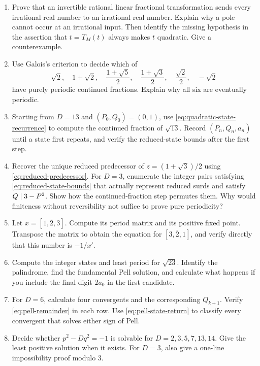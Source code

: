 \begin{exercisebox}
\begin{enumerate}
  \item Prove that an invertible rational linear fractional transformation
  sends every irrational real number to an irrational real number.
  Explain why a pole cannot occur at an irrational input. Then identify
  the missing hypothesis in the assertion that $t=T_M(t)$ always makes
  $t$ quadratic. Give a counterexample. 
  \item Use Galois's criterion to decide which of
  \[
   \sqrt2,\quad 1+\sqrt2,\quad \frac{1+\sqrt5}{2},\quad
   \frac{1+\sqrt3}{2},\quad \frac{\sqrt2}{2},\quad -\sqrt2
  \]
  have purely periodic continued fractions. Explain why all six are
  eventually periodic. 
  \item Starting from $D=13$ and $(P_0,Q_0)=(0,1)$, use
  \eqref{eq:quadratic-state-recurrence} to compute the continued fraction
  of $\sqrt{13}$. Record $(P_n,Q_n,a_n)$ until a state first repeats,
  and verify the reduced-state bounds after the first step.
  \item Recover the unique reduced predecessor of
  $z=(1+\sqrt3)/2$ using \eqref{eq:reduced-predecessor}.
  For $D=3$, enumerate the integer pairs satisfying
  \eqref{eq:reduced-state-bounds} that actually represent reduced surds
  and satisfy $Q\mid3-P^2$. Show how the continued-fraction step
  permutes them. Why would finiteness without reversibility not suffice
  to prove pure periodicity? 
  \item Let $x=[\overline{1,2,3}]$. Compute its period matrix and its
  positive fixed point. Transpose the matrix to obtain the equation for
  $[\overline{3,2,1}]$, and verify directly that this number is $-1/x'$.
  \item Compute the integer states and least period for $\sqrt{23}$.
  Identify the palindrome, find the fundamental Pell solution, and
  calculate what happens if you include the final digit $2a_0$ in the
  first candidate. 
  \item For $D=6$, calculate four convergents and the corresponding
  $Q_{k+1}$. Verify \eqref{eq:pell-remainder} in each row. Use
  \eqref{eq:pell-state-return} to classify every convergent that solves
  either sign of Pell. 
  \item Decide whether $p^2-Dq^2=-1$ is solvable for
  $D=2,3,5,7,13,14$. Give the least positive solution when it exists.
  For $D=3$, also give a one-line impossibility proof modulo $3$.

\end{enumerate}
\end{exercisebox}

